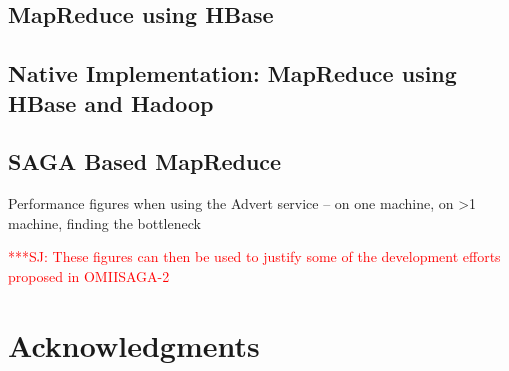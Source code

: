 \documentclass{rspublic}
\newcommand{\jhanote}[1]{ {\textcolor{red} { ***SJ: #1 }}}
\newcommand{\jhanote}[1]{}
\begin{document}
\subsection*{MapReduce using HBase}

\subsection*{Native Implementation: MapReduce using HBase and Hadoop}

\subsection*{SAGA Based MapReduce}

Performance figures when using the Advert service -- on one machine,
on >1 machine, finding the bottleneck

\jhanote{These figures can then be used to justify some of the 
  development efforts proposed in OMIISAGA-2}

\section{Acknowledgments}



\end{document}
